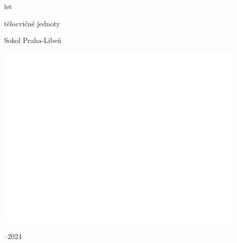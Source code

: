 \documentclass[a5paper, 11pt, twoside]{article}
\newcommand{\titlesize}{\fontsize{36pt}{54pt}}
\begin{document}
\setlength{\oddsidemargin}{-24pt}
\pagecolor{sokolred}
\color{white}
\begin{center}
  \setlength{\parskip}{6pt}
  \vspace*{18pt}
  {\fontsize{56pt}{66pt} let}

  {\titlesize\tyrs tělocvičné jednoty}
  
  {\titlesize\tyrs Sokol Praha-Libeň}

  \vspace*{\fill}

    \includegraphics*[width=0.9\textwidth]{./Sokolovna-kresba-white.png}

  \vspace*{\fill}

  {\titlesize{}–2024}
  \vspace*{-1cm}
\end{center}
\clearpage

\normalcolor
\nopagecolor

\null\clearpage
\setlength{\oddsidemargin}{-4mm}
\setlength{\evensidemargin}{-14mm}
\end{document}
